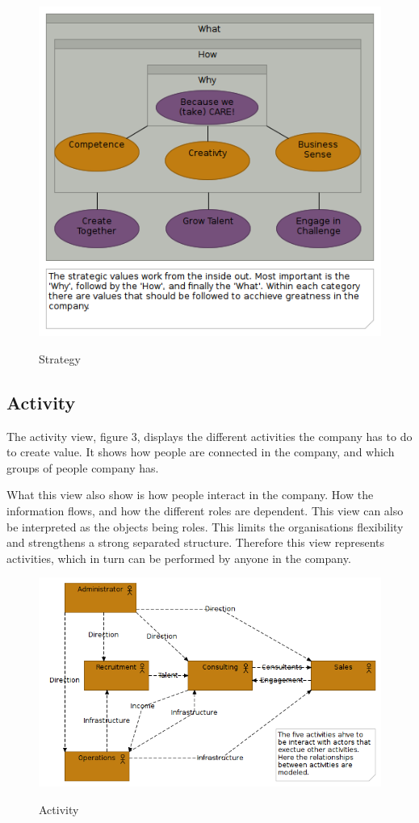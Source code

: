 \documentclass[12pt, a4paper]{article}
\begin{document}
\begin{figure}[htb]
    \centering
    \includegraphics[width=\textwidth]{Strategy} 
    \label{fig:Strategy}
    \caption{Strategy}
\end{figure}

\subsection{Activity}
The activity view, figure 3, displays the different activities the company has to do to
create value. It shows how people are connected in the company, and which groups
of people company has. 

What this view also show is how people interact in the company. How the
information flows, and how the different roles are dependent. This view can
also be interpreted as the objects being roles. This limits the organisations
flexibility and strengthens a strong separated structure. Therefore this view
represents activities, which in turn can be performed by anyone in the company. 

\begin{figure}[htb]
    \centering
    \includegraphics[width=\textwidth]{Activity} 
    \label{fig:Activity}
    \caption{Activity}
\end{figure}
\end{document}
